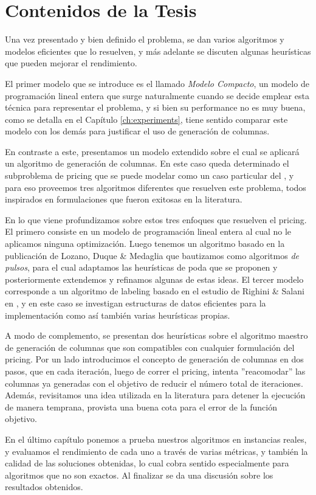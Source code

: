 \section{Contenidos de la Tesis}

Una vez presentado y bien definido el problema, se dan varios algoritmos y modelos eficientes que lo resuelven, y más adelante se discuten algunas heurísticas que pueden mejorar el rendimiento. 

El primer modelo que se introduce es el llamado \emph{Modelo Compacto}, un modelo de programación lineal entera que surge naturalmente cuando se decide emplear esta técnica para representar el problema, y si bien su performance no es muy buena, como se detalla en el Capítulo \ref{ch:experiments}, tiene sentido comparar este modelo con los demás para justificar el uso de generación de columnas.

En contraste a este, presentamos un modelo extendido sobre el cual se aplicará un algoritmo de generación de columnas. En este caso queda determinado el subproblema de pricing que se puede modelar como un caso particular del , y para eso proveemos tres algoritmos diferentes que resuelven este problema, todos inspirados en formulaciones que fueron exitosas en la literatura. 

En lo que viene profundizamos sobre estos tres enfoques que resuelven el pricing. El primero consiste en un modelo de programación lineal entera al cual no le aplicamos ninguna optimización. Luego tenemos un algoritmo basado en la publicación de Lozano, Duque \& Medaglia \cite{lozano-duque-medaglia} que bautizamos como algoritmos \emph{de pulsos}, para el cual adaptamos las heurísticas de poda que se proponen y posteriormente extendemos y refinamos algunas de estas ideas. El tercer modelo corresponde a un algoritmo de labeling basado en el estudio de Righini \& Salani en \cite{righini-salani}, y en este caso se investigan estructuras de datos eficientes para la implementación como así también varias heurísticas propias. 

A modo de complemento, se presentan dos heurísticas sobre el algoritmo maestro de generación de columnas que son compatibles con cualquier formulación del pricing. Por un lado introducimos el concepto de generación de columnas en dos pasos, que en cada iteración, luego de correr el pricing, intenta ''reacomodar'' las columnas ya generadas con el objetivo de reducir el número total de iteraciones. Además, revisitamos una idea utilizada en la literatura para detener la ejecución de manera temprana, provista una buena cota para el error de la función objetivo.

En el último capítulo ponemos a prueba nuestros algoritmos en instancias reales, y evaluamos el rendimiento de cada uno a través de varias métricas, y también la calidad de las soluciones obtenidas, lo cual cobra sentido especialmente para algoritmos que no son exactos. Al finalizar se da una discusión sobre los resultados obtenidos.
